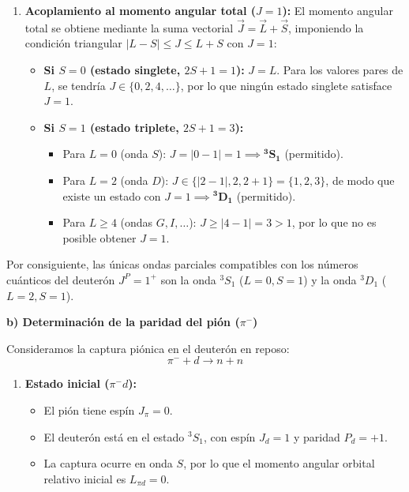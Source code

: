 \begin{problema}
\begin{enumerate}[label=\arabic*.]
    \item \textbf{Acoplamiento al momento angular total ($J = 1$):}
    El momento angular total se obtiene mediante la suma vectorial $\vec{J} = \vec{L} + \vec{S}$, imponiendo la condición triangular $|L - S| \le J \le L + S$ con $J = 1$:
    \begin{itemize}
        \item \textbf{Si $S = 0$ (estado singlete, $2S+1 = 1$):}
        $J = L$. Para los valores pares de $L$, se tendría $J \in \{0, 2, 4, \dots\}$, por lo que ningún estado singlete satisface $J = 1$.
        \item \textbf{Si $S = 1$ (estado triplete, $2S+1 = 3$):}
        \begin{itemize}
            \item Para $L = 0$ (onda $S$): $J = |0 - 1| = 1 \implies \mathbf{^3S_1}$ (permitido).
            \item Para $L = 2$ (onda $D$): $J \in \{|2-1|, 2, 2+1\} = \{1, 2, 3\}$, de modo que existe un estado con $J = 1 \implies \mathbf{^3D_1}$ (permitido).
            \item Para $L \ge 4$ (ondas $G, I, \dots$): $J \ge |4 - 1| = 3 > 1$, por lo que no es posible obtener $J = 1$.
        \end{itemize}
    \end{itemize}
\end{enumerate}

Por consiguiente, las únicas ondas parciales compatibles con los números cuánticos del deuterón $J^P = 1^+$ son la onda \textbf{$^3S_1$} ($L=0, S=1$) y la onda \textbf{$^3D_1$} ($L=2, S=1$).

\vspace{0.3cm}
\textbf{b) Determinación de la paridad del pión ($\pi^-$)}

Consideramos la captura piónica en el deuterón en reposo:
\begin{equation*}
    \pi^- + d \longrightarrow n + n
\end{equation*}

\begin{enumerate}[label=\arabic*.]
    \item \textbf{Estado inicial ($\pi^- d$):}
    \begin{itemize}
        \item El pión tiene espín $J_\pi = 0$.
        \item El deuterón está en el estado $^3S_1$, con espín $J_d = 1$ y paridad $P_d = +1$.
        \item La captura ocurre en onda $S$, por lo que el momento angular orbital relativo inicial es $L_{\pi d} = 0$.
    \end{itemize}
    

\end{enumerate}
\end{problema}

